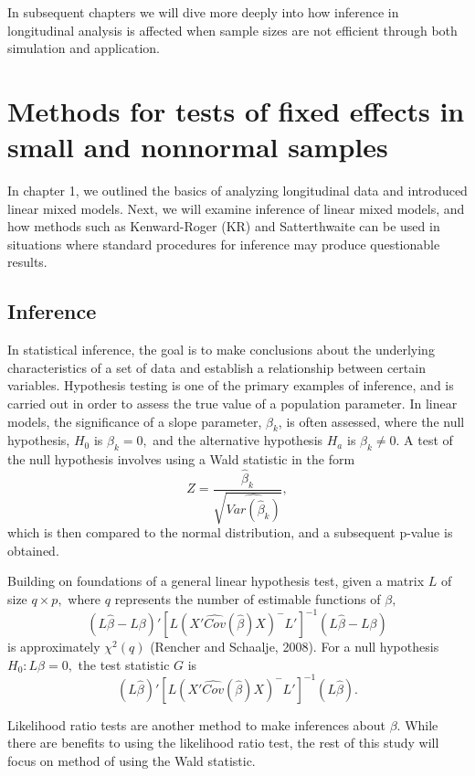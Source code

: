 \documentclass[12pt, twoside]{amherstthesis}
\begin{document}
In subsequent chapters we will dive more deeply into how inference in longitudinal analysis is affected when sample sizes are not efficient through both simulation and application.

\hypertarget{rmd-basics}{%
\chapter{Methods for tests of fixed effects in small and nonnormal samples}\label{rmd-basics}}

In chapter 1, we outlined the basics of analyzing longitudinal data and introduced linear mixed models. Next, we will examine inference of linear mixed models, and how methods such as Kenward-Roger (KR) and Satterthwaite can be used in situations where standard procedures for inference may produce questionable results.

\hypertarget{inference}{%
\section{Inference}\label{inference}}

In statistical inference, the goal is to make conclusions about the underlying characteristics of a set of data and establish a relationship between certain variables. Hypothesis testing is one of the primary examples of inference, and is carried out in order to assess the true value of a population parameter. In linear models, the significance of a slope parameter, \(\beta_k\), is often assessed, where the null hypothesis, \(H_0\) is \(\beta_k = 0,\) and the alternative hypothesis \(H_a\) is \(\beta_k \neq 0.\) A test of the null hypothesis involves using a Wald statistic in the form \[ Z = \frac{\hat\beta_k}{\sqrt{\widehat{Var(\hat\beta_k)}}},\] which is then compared to the normal distribution, and a subsequent p-value is obtained.

Building on foundations of a general linear hypothesis test, given a matrix \(L\) of size \(q \times p,\) where \(q\) represents the number of estimable functions of \(\beta,\) \[(L\hat\beta-L\beta)'[L(X'\widehat {Cov}(\hat\beta)X)^-L']^{-1}(L\hat\beta-L\beta)
\] is approximately \(\chi^2(q)\) (Rencher and Schaalje, 2008). For a null hypothesis \(H_0: L\beta = 0,\) the test statistic \(G\) is \[(L\hat\beta)'[L(X'\widehat {Cov}(\hat\beta)X)^-L']^{-1}(L\hat\beta).\]

Likelihood ratio tests are another method to make inferences about \(\beta\). While there are benefits to using the likelihood ratio test, the rest of this study will focus on method of using the Wald statistic.
\end{document}
